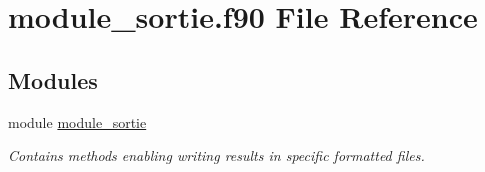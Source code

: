 \hypertarget{module__sortie_8f90}{}\section{module\+\_\+sortie.\+f90 File Reference}
\label{module__sortie_8f90}
\subsection*{Modules}
\begin{DoxyCompactItemize}
\item 
module \hyperlink{namespacemodule__sortie}{module\+\_\+sortie}
\begin{DoxyCompactList}\small\item\em Contains methods enabling writing results in specific formatted files. \end{DoxyCompactList}\end{DoxyCompactItemize}

